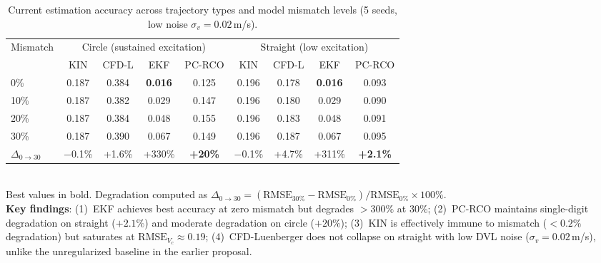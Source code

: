 \begin{table}[t]
\centering
\caption{Current estimation accuracy across trajectory types and model mismatch levels (5 seeds, low noise $\sigma_v=0.02$\,m/s).}
\label{tab:trajectory_comparison}
\begin{tabular}{lcccc|cccc}
\toprule
\multirow{2}{*}{Mismatch} & \multicolumn{4}{c|}{Circle (sustained excitation)} & \multicolumn{4}{c}{Straight (low excitation)} \\
\cmidrule(lr){2-5} \cmidrule(lr){6-9}
& KIN & CFD-L & EKF & PC-RCO & KIN & CFD-L & EKF & PC-RCO \\
\midrule
 0\% & 0.187 & 0.384 & \textbf{0.016} & 0.125 & 0.196 & 0.178 & \textbf{0.016} & 0.093 \\
10\% & 0.187 & 0.382 & 0.029 & 0.147 & 0.196 & 0.180 & 0.029 & 0.090 \\
20\% & 0.187 & 0.384 & 0.048 & 0.155 & 0.196 & 0.183 & 0.048 & 0.091 \\
30\% & 0.187 & 0.390 & 0.067 & 0.149 & 0.196 & 0.187 & 0.067 & 0.095 \\
\midrule
$\Delta_{0\to30}$ & $-$0.1\% & +1.6\% & +330\% & \textbf{+20\%} & $-$0.1\% & +4.7\% & +311\% & \textbf{+2.1\%} \\
\bottomrule
\end{tabular}
\\[4pt]
\footnotesize{Best values in bold. Degradation computed as $\Delta_{0\to30}=(\text{RMSE}_{30\%}-\text{RMSE}_{0\%})/\text{RMSE}_{0\%}\times100\%$.}
\\[4pt]
\footnotesize{\textbf{Key findings}: (1)~EKF achieves best accuracy at zero mismatch but degrades $>300\%$ at 30\%; (2)~PC-RCO maintains single-digit degradation on straight ($+2.1\%$) and moderate degradation on circle ($+20\%$); (3)~KIN is effectively immune to mismatch ($<0.2\%$ degradation) but saturates at $\text{RMSE}_{V_c}\approx0.19$; (4)~CFD-Luenberger does not collapse on straight with low DVL noise ($\sigma_v=0.02$\,m/s), unlike the unregularized baseline in the earlier proposal.}
\end{table}
